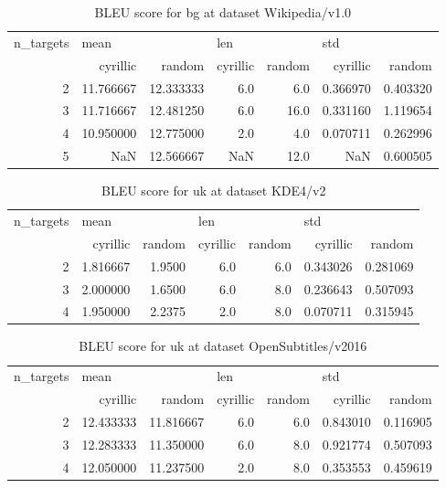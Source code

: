 \begin{table}[h]
\begin{tabular}{rrrrrrr}
\toprule
n\_targets & \multicolumn{2}{l}{mean} & \multicolumn{2}{l}{len} & \multicolumn{2}{l}{std} \\
          &   cyrillic &     random & cyrillic & random &  cyrillic &    random \\
\midrule
        2 &  11.766667 &  12.333333 &      6.0 &    6.0 &  0.366970 &  0.403320 \\
        3 &  11.716667 &  12.481250 &      6.0 &   16.0 &  0.331160 &  1.119654 \\
        4 &  10.950000 &  12.775000 &      2.0 &    4.0 &  0.070711 &  0.262996 \\
        5 &        NaN &  12.566667 &      NaN &   12.0 &       NaN &  0.600505 \\
\bottomrule
\end{tabular}

\caption{BLEU score for  bg at dataset Wikipedia/v1.0 }
\label{ table:bg/Wikipedia/v1.0 }
\end{table}

\begin{table}[h]
\begin{tabular}{rrrrrrr}
\toprule
n\_targets & \multicolumn{2}{l}{mean} & \multicolumn{2}{l}{len} & \multicolumn{2}{l}{std} \\
          &  cyrillic &  random & cyrillic & random &  cyrillic &    random \\
\midrule
        2 &  1.816667 &  1.9500 &      6.0 &    6.0 &  0.343026 &  0.281069 \\
        3 &  2.000000 &  1.6500 &      6.0 &    8.0 &  0.236643 &  0.507093 \\
        4 &  1.950000 &  2.2375 &      2.0 &    8.0 &  0.070711 &  0.315945 \\
\bottomrule
\end{tabular}

\caption{BLEU score for  uk at dataset KDE4/v2 }
\label{ table:uk/KDE4/v2 }
\end{table}

\begin{table}[h]
\begin{tabular}{rrrrrrr}
\toprule
n\_targets & \multicolumn{2}{l}{mean} & \multicolumn{2}{l}{len} & \multicolumn{2}{l}{std} \\
          &   cyrillic &     random & cyrillic & random &  cyrillic &    random \\
\midrule
        2 &  12.433333 &  11.816667 &      6.0 &    6.0 &  0.843010 &  0.116905 \\
        3 &  12.283333 &  11.350000 &      6.0 &    8.0 &  0.921774 &  0.507093 \\
        4 &  12.050000 &  11.237500 &      2.0 &    8.0 &  0.353553 &  0.459619 \\
\bottomrule
\end{tabular}

\caption{BLEU score for  uk at dataset OpenSubtitles/v2016 }
\label{ table:uk/OpenSubtitles/v2016 }
\end{table}

